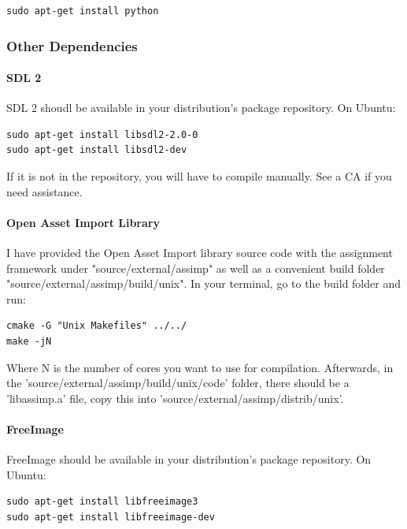 \documentclass{article}
\begin{document}
\begin{lstlisting}
sudo apt-get install python
\end{lstlisting}

\subsubsection*{Other Dependencies}

\paragraph{\textbf{SDL 2}}

SDL 2 shoudl be available in your distribution's package repository. On Ubuntu:

\begin{lstlisting}
sudo apt-get install libsdl2-2.0-0
sudo apt-get install libsdl2-dev
\end{lstlisting}

If it is not in the repository, you will have to compile manually. See a CA if you need assistance.

\paragraph{\textbf{Open Asset Import Library}}

I have provided the Open Asset Import library source code with the assignment framework under "source/external/assimp" as well as a convenient build folder "source/external/assimp/build/unix". In your terminal, go to the build folder and run:

\begin{lstlisting}
cmake -G "Unix Makefiles" ../../
make -jN
\end{lstlisting}

Where N is the number of cores you want to use for compilation. Afterwards, in the 'source/external/assimp/build/unix/code' folder, there should be a 'libassimp.a' file, copy this into 'source/external/assimp/distrib/unix'.

\paragraph{\textbf{FreeImage}}

FreeImage should be available in your distribution's package repository. On Ubuntu:

\begin{lstlisting}
sudo apt-get install libfreeimage3
sudo apt-get install libfreeimage-dev
\end{lstlisting}
\end{document}
